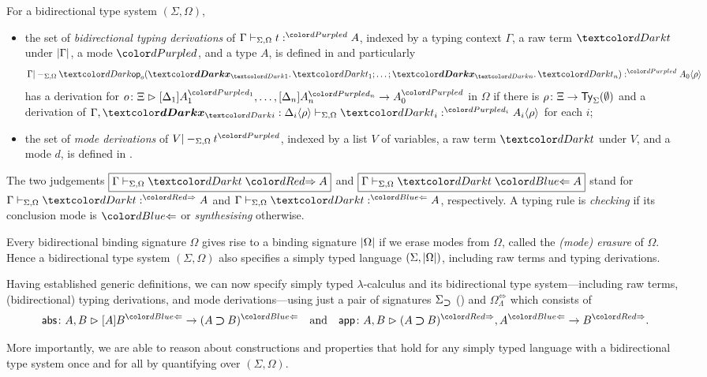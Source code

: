 \begin{definition}\label{def:bidirectional-typing-derivations}\label{def:mode-derivations}
  For a bidirectional type system $(\Sigma, \Omega)$,
  \begin{itemize}
    \item the set of \emph{bidirectional typing derivations} of $\Gamma \vdash_{\Sigma, \Omega} t :^\dir{d} A$, indexed by a typing context $\Gamma$, a raw term $\isTerm{t}$ under $\left|\Gamma\right|$, a mode $\dir{d}$, and a type $A$, is defined in  and particularly
          \[
            \Gamma |-_{\Sigma, \Omega} \tmOpts :^{\dir{d}} \simsub{A_0}{\rho}
          \]
          has a derivation for $\biop$ in $\Omega$ if there is $\rho\colon \Xi \to \mathsf{Ty}_{\Sigma}(\emptyset)$ and a derivation of $\Gamma, \vars{x}_{\isTerm{i}} : \simsub{\Delta_i}{\rho} \vdash_{\Sigma, \Omega} \isTerm{t_i} :^{\dir{d_i}} \simsub{A_i}{\rho}$ for each $i$;
    \item the set of \emph{mode derivations} of $V |-_{\Sigma, \Omega} t^\dir{d}$, indexed by a list $V$ of variables, a raw term $\isTerm{t}$ under $V$, and a mode $d$, is defined in .
  \end{itemize}
  The two judgements {\small$\boxed{\Gamma \vdash_{\Sigma, \Omega} \isTerm{t} \syn A}$} and {\small$\boxed{\Gamma \vdash_{\Sigma, \Omega} \isTerm{t} \chk A}$} stand for ${\Gamma \vdash_{\Sigma, \Omega} \isTerm{t} :^{\syn} A}$ and ${\Gamma \vdash_{\Sigma, \Omega} \isTerm{t} :^{\chk} A}$, respectively.
  A typing rule is \emph{checking} if its conclusion mode is $\chk$ or \emph{synthesising} otherwise.
\end{definition}

Every bidirectional binding signature $\Omega$ gives rise to a binding signature $\left|\Omega\right|$ if we erase modes from $\Omega$, called the \emph{(mode) erasure} of $\Omega$.
Hence a bidirectional type system $(\Sigma, \Omega)$ also specifies a simply typed language $(\Sigma, \left|\Omega\right|)$, including raw terms and typing derivations.

\begin{example}\label{ex:signature-simply-typed-lambda}
Having established generic definitions, we can now specify simply typed $\lambda$-calculus and its bidirectional type system---including raw terms, (bidirectional) typing derivations, and mode derivations---using just a pair of signatures $\Sigma_{\mathbin{\bm{\supset}}}$ () and $\Omega^{\Leftrightarrow}_\Lambda$ which consists of 
\[
  \aritysymbol{\mathsf{abs}}{A , B}{[A]B^{\chk}}{(A \bto B)^{\chk}}
  \quad\text{and}\quad
  \aritysymbol{\mathsf{app}}{A, B}{(A \bto B)^{\syn}, A^{\chk}}{B^{\syn}}.
\]
\end{example}
More importantly, we are able to reason about constructions and properties that hold for any simply typed language with a bidirectional type system once and for all by quantifying over $(\Sigma, \Omega)$.

